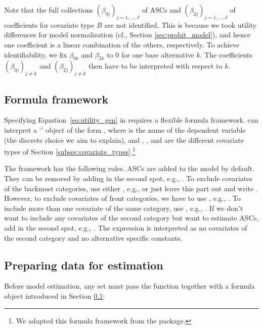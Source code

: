 \documentclass[article,shortnames]{jss}
\newcommand{\class}[1]{`\code{#1}'}
\newcommand{\fct}[1]{\code{#1()}}
\begin{document}
Note that the full collections $(\beta_{0j})_{j=1,\dots,J}$ of ASCs and $(\beta_{2j})_{j=1,\dots,J}$ of coefficients for covariate type $B$ are not identified. This is because we took utility differences for model normalization (cf., Section \ref{sec:probit_model}), and hence one coefficient is a linear combination of the others, respectively. To achieve identifiability, we fix $\beta_{0k}$ and $\beta_{2k}$ to 0 for one base alternative $k$. The coefficients $(\beta_{0j})_{j\neq k}$ and $(\beta_{2j})_{j\neq k}$ then have to be interpreted with respect to $k$.

\subsection{Formula framework} \label{subsec:formula}

Specifying Equation~\ref{eq:utility_gen} in  requires a flexible formula framework.  can interpret a \class{formula} object of the form , where  is the name of the dependent variable (the discrete choice we aim to explain), and , , and  are the different covariate types of Section \ref{subsec:covariate_types}.\footnote{We adapted this formula framework from the  package.}

The framework has the following rules. ASCs are added to the model by default. They can be removed by adding  in the second spot, e.g., . To exclude covariates of the backmost categories, use either , e.g.,  or just leave this part out and write . However, to exclude covariates of front categories, we have to use , e.g., . To include more than one covariate of the same category, use \code{+}, e.g., . If we don't want to include any covariates of the second category but want to estimate ASCs, add  in the second spot, e.g., . The expression  is interpreted as no covariates of the second category and no alternative specific constants.

\subsection{Preparing data for estimation} \label{subsec:prepare_data}

Before model estimation, any  set must pass the \fct{prepare\_data} function together with a formula object  introduced in Section \ref{subsec:formula}:
\end{document}
